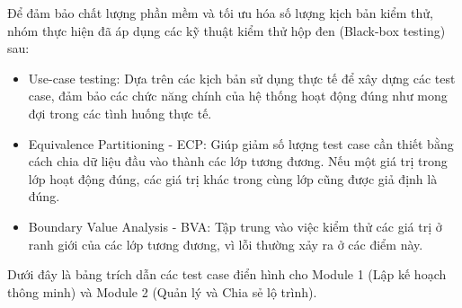 Để đảm bảo chất lượng phần mềm và tối ưu hóa số lượng kịch bản kiểm thử, nhóm thực hiện đã áp dụng các kỹ thuật kiểm thử hộp đen (Black-box testing) sau:
\begin{itemize}
    \item Use-case testing: Dựa trên các kịch bản sử dụng thực tế để xây dựng các test case, đảm bảo các chức năng chính của hệ thống hoạt động đúng như mong đợi trong các tình huống thực tế.
    \item Equivalence Partitioning - ECP: Giúp giảm số lượng test case cần thiết bằng cách chia dữ liệu đầu vào thành các lớp tương đương. Nếu một giá trị trong lớp hoạt động đúng, các giá trị khác trong cùng lớp cũng được giả định là đúng.
    \item Boundary Value Analysis - BVA: Tập trung vào việc kiểm thử các giá trị ở ranh giới của các lớp tương đương, vì lỗi thường xảy ra ở các điểm này.
\end{itemize}

Dưới đây là bảng trích dẫn các test case điển hình cho Module 1 (Lập kế hoạch thông minh) và Module 2 (Quản lý và Chia sẻ lộ trình).




